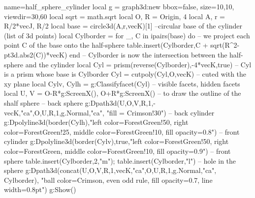 \documentclass[border=5pt]{standalone}%
\begin{document}
\begin{luadraw}{name=half_sphere_cylinder}
local g = graph3d:new{ bbox=false, size={10,10}, viewdir={30,60}}
local sqrt = math.sqrt
local O, R = Origin, 4
local A, r = R/2*vecJ, R/2
local base = circle3d(A,r,vecK)[1] --circular base of the cylinder (list of 3d points)
local Cylborder = {}
for _, C in ipairs(base) do -- we project each point C of the base onto the half-sphere
    table.insert(Cylborder,C + sqrt(R^2-pt3d.abs2(C))*vecK)
end -- Cylborder is now the intersection between the half-sphere and the cylinder
local Cyl = prism(reverse(Cylborder),-4*vecK,true) -- Cyl is a prism whose base is Cylborder
Cyl = cutpoly(Cyl,{O,vecK}) -- cuted with the xy plane
local Cylv, Cylh = g:Classifyfacet(Cyl) -- visible facets, hidden facets
local U, V = O-R*g:ScreenX(), O+R*g:ScreenX() -- to draw the outline of the shalf sphere
-- back sphere
g:Dpath3d({U,O,V,R,1,-vecK,"ca",O,U,R,1,g.Normal,"ca"}, "fill = Crimson!30")
-- back cylinder
g:Dpolyline3d(border(Cylh),"left color=ForestGreen!50, right color=ForestGreen!25, middle color=ForestGreen!10, fill opacity=0.8")
-- front cylinder
g:Dpolyline3d(border(Cylv),true,"left color=ForestGreen!50, right color=ForestGreen, middle color=ForestGreen!10, fill opacity=0.9")
-- front sphere
table.insert(Cylborder,2,"m"); table.insert(Cylborder,"l") -- hole in the sphere
g:Dpath3d(concat({U,O,V,R,1,vecK,"ca",O,U,R,1,g.Normal,"ca"}, Cylborder), "ball color=Crimson, even odd rule, fill opacity=0.7, line width=0.8pt")
g:Show()
\end{luadraw}
\end{document}
